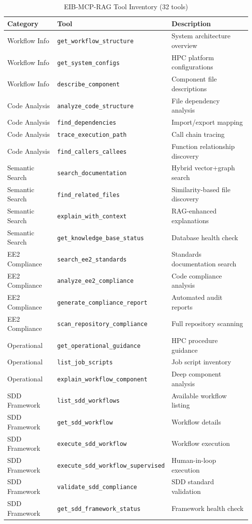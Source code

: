 \documentclass[11pt,letterpaper]{article}
\begin{document}
\begin{table}[h]
\centering
\footnotesize
\begin{tabular}{@{}lll@{}}
\toprule
\textbf{Category} & \textbf{Tool} & \textbf{Description} \\
\midrule
Workflow Info & \texttt{get\_workflow\_structure} & System architecture overview \\
Workflow Info & \texttt{get\_system\_configs} & HPC platform configurations \\
Workflow Info & \texttt{describe\_component} & Component file descriptions \\
\midrule
Code Analysis & \texttt{analyze\_code\_structure} & File dependency analysis \\
Code Analysis & \texttt{find\_dependencies} & Import/export mapping \\
Code Analysis & \texttt{trace\_execution\_path} & Call chain tracing \\
Code Analysis & \texttt{find\_callers\_callees} & Function relationship discovery \\
\midrule
Semantic Search & \texttt{search\_documentation} & Hybrid vector+graph search \\
Semantic Search & \texttt{find\_related\_files} & Similarity-based file discovery \\
Semantic Search & \texttt{explain\_with\_context} & RAG-enhanced explanations \\
Semantic Search & \texttt{get\_knowledge\_base\_status} & Database health check \\
\midrule
EE2 Compliance & \texttt{search\_ee2\_standards} & Standards documentation search \\
EE2 Compliance & \texttt{analyze\_ee2\_compliance} & Code compliance analysis \\
EE2 Compliance & \texttt{generate\_compliance\_report} & Automated audit reports \\
EE2 Compliance & \texttt{scan\_repository\_compliance} & Full repository scanning \\
\midrule
Operational & \texttt{get\_operational\_guidance} & HPC procedure guidance \\
Operational & \texttt{list\_job\_scripts} & Job script inventory \\
Operational & \texttt{explain\_workflow\_component} & Deep component analysis \\
\midrule
SDD Framework & \texttt{list\_sdd\_workflows} & Available workflow listing \\
SDD Framework & \texttt{get\_sdd\_workflow} & Workflow details \\
SDD Framework & \texttt{execute\_sdd\_workflow} & Workflow execution \\
SDD Framework & \texttt{execute\_sdd\_workflow\_supervised} & Human-in-loop execution \\
SDD Framework & \texttt{validate\_sdd\_compliance} & SDD standard validation \\
SDD Framework & \texttt{get\_sdd\_framework\_status} & Framework health check \\
\bottomrule
\end{tabular}
\caption{EIB-MCP-RAG Tool Inventory (32 tools)}
\label{tab:tools}
\end{table}
\end{document}
